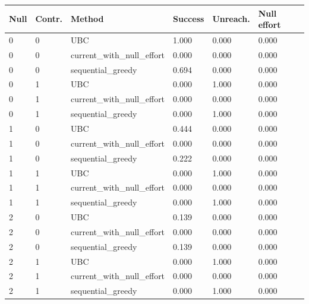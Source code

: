\begin{tabular}{llllll}
\toprule
Null & Contr. & Method & Success & Unreach. & Null effort \\
\midrule
0 & 0 & UBC & 1.000 & 0.000 & 0.000 \\
0 & 0 & current\_with\_null\_effort & 0.000 & 0.000 & 0.000 \\
0 & 0 & sequential\_greedy & 0.694 & 0.000 & 0.000 \\
0 & 1 & UBC & 0.000 & 1.000 & 0.000 \\
0 & 1 & current\_with\_null\_effort & 0.000 & 0.000 & 0.000 \\
0 & 1 & sequential\_greedy & 0.000 & 1.000 & 0.000 \\
1 & 0 & UBC & 0.444 & 0.000 & 0.000 \\
1 & 0 & current\_with\_null\_effort & 0.000 & 0.000 & 0.000 \\
1 & 0 & sequential\_greedy & 0.222 & 0.000 & 0.000 \\
1 & 1 & UBC & 0.000 & 1.000 & 0.000 \\
1 & 1 & current\_with\_null\_effort & 0.000 & 0.000 & 0.000 \\
1 & 1 & sequential\_greedy & 0.000 & 1.000 & 0.000 \\
2 & 0 & UBC & 0.139 & 0.000 & 0.000 \\
2 & 0 & current\_with\_null\_effort & 0.000 & 0.000 & 0.000 \\
2 & 0 & sequential\_greedy & 0.139 & 0.000 & 0.000 \\
2 & 1 & UBC & 0.000 & 1.000 & 0.000 \\
2 & 1 & current\_with\_null\_effort & 0.000 & 0.000 & 0.000 \\
2 & 1 & sequential\_greedy & 0.000 & 1.000 & 0.000 \\
\bottomrule
\end{tabular}
